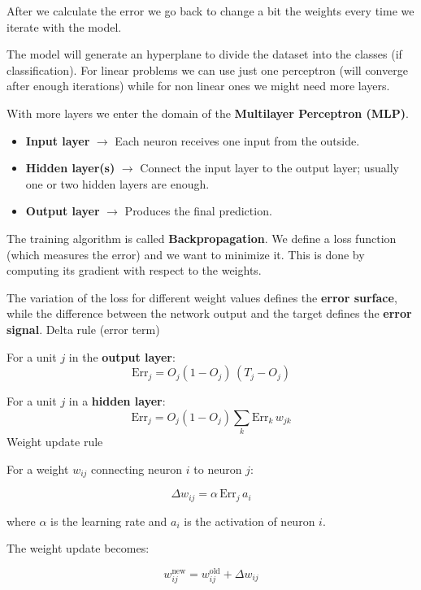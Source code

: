 After we calculate the error we go back to change a bit the weights every time we iterate with the model.

\vspace{10pt}

The model will generate an hyperplane to divide the dataset into the classes (if classification).
For linear problems we can use just one perceptron (will converge after enough iterations) while for non linear ones we might need more layers. 

\vspace{10pt}
With more layers we enter the domain of the \textbf{Multilayer Perceptron (MLP)}.

\begin{itemize}
    \item \textbf{Input layer} $\rightarrow$ Each neuron receives one input from the outside.
    \item \textbf{Hidden layer(s)} $\rightarrow$ Connect the input layer to the output layer; usually one or two hidden layers are enough.
    \item \textbf{Output layer} $\rightarrow$ Produces the final prediction.
\end{itemize}

The training algorithm is called \textbf{Backpropagation}.  
We define a loss function (which measures the error) and we want to minimize it.  
This is done by computing its gradient with respect to the weights.

The variation of the loss for different weight values defines the \textbf{error surface},  
while the difference between the network output and the target defines the \textbf{error signal}.
\vspace{10pt}
Delta rule (error term)

For a unit $j$ in the \textbf{output layer}:
\[
\mathrm{Err}_j = O_j (1 - O_j)\,(T_j - O_j)
\]

For a unit $j$ in a \textbf{hidden layer}:
\[
\mathrm{Err}_j = O_j (1 - O_j)\sum_{k} \mathrm{Err}_k \, w_{jk}
\]
\vspace{10pt}
Weight update rule

For a weight $w_{ij}$ connecting neuron $i$ to neuron $j$:

\[
\Delta w_{ij} = \alpha\, \mathrm{Err}_j \, a_i
\]

where $\alpha$ is the learning rate and $a_i$ is the activation of neuron $i$.

The weight update becomes:

\[
w_{ij}^{\text{new}} = w_{ij}^{\text{old}} + \Delta w_{ij}
\]

